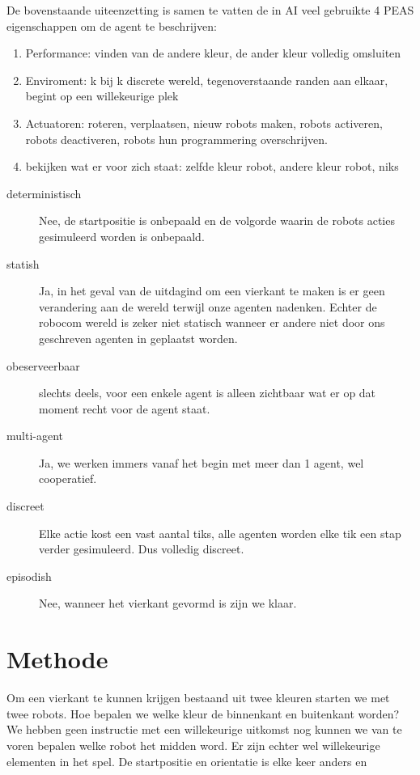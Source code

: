 \documentclass[10pt]{article}
\begin{document}
De bovenstaande uiteenzetting is samen te vatten de in AI veel gebruikte 4 PEAS eigenschappen om de agent te beschrijven: 

\begin{enumerate}
    \item Performance: vinden van de andere kleur, de ander kleur volledig omsluiten
    \item Enviroment: k bij k discrete wereld, tegenoverstaande randen aan elkaar, begint op een willekeurige plek
    \item Actuatoren: roteren, verplaatsen, nieuw robots maken, robots activeren, robots deactiveren, robots hun programmering overschrijven.
    \item bekijken wat er voor zich staat: zelfde kleur robot, andere kleur robot, niks
\end{enumerate}

\begin{description}
 \item[deterministisch] Nee, de startpositie is onbepaald en de volgorde waarin de robots acties gesimuleerd worden is onbepaald. 
 \item[statish] Ja, in het geval van de uitdagind om een vierkant te maken is er geen verandering aan de wereld terwijl onze agenten nadenken. Echter de robocom wereld is zeker niet statisch wanneer er andere niet door ons geschreven agenten in geplaatst worden.
 \item[obeserveerbaar] slechts deels, voor een enkele agent is alleen zichtbaar wat er op dat moment recht voor de agent staat.

 \item[multi-agent] Ja, we werken immers vanaf het begin met meer dan 1 agent, wel cooperatief.
 \item[discreet] Elke actie kost een vast aantal tiks, alle agenten worden elke tik een stap verder gesimuleerd. Dus volledig discreet.
 \item[episodish] Nee, wanneer het vierkant gevormd is zijn we klaar.
\end{description}


\section{Methode}

Om een vierkant te kunnen krijgen bestaand uit twee kleuren starten we met twee robots. Hoe bepalen we welke kleur de binnenkant en buitenkant worden? We hebben geen instructie met een willekeurige uitkomst nog kunnen we van te voren bepalen welke robot het midden word. Er zijn echter wel willekeurige elementen in het spel. De startpositie en orientatie is elke keer anders en
\end{document}
